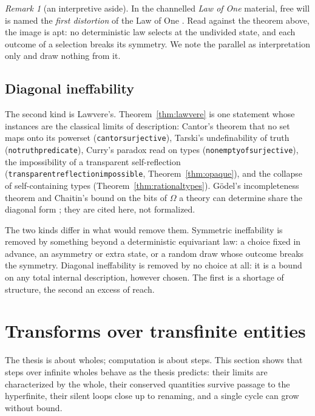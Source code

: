 \documentclass[]{article}
\theoremstyle{definition}
\theoremstyle{remark}
\newtheorem{remark}[theorem]{Remark}
\newcommand{\codeus}{\textunderscore\allowbreak}
\newcommand{\code}[1]{\texttt{\let\_\codeus #1}}
\newcommand{\Om}{\Omega}
\begin{document}
\begin{remark}[an interpretive aside]
\label{rem:ra}
In the channelled \emph{Law of One} material, free will is named the \emph{first distortion} of the
Law of One \cite{RaMaterial}. Read against the theorem above, the image is apt: no deterministic law
selects at the undivided state, and each outcome of a selection breaks its symmetry. We note
the parallel as interpretation only and draw nothing from it.
\end{remark}

\subsection{Diagonal ineffability}
\label{sec:diagonal}

The second kind is Lawvere's. Theorem~\ref{thm:lawvere} is one statement whose instances are the
classical limits of description: Cantor's theorem that no set maps onto its powerset
\cite{Cantor1891} (\code{cantor\_surjective}), Tarski's undefinability of truth \cite{Tarski1936}
(\code{no\_truth\_predicate}), Curry's paradox read on types (\code{nonempty\_of\_surjective}), the
impossibility of a transparent self-reflection (\code{transparent\_reflection\_impossible},
Theorem~\ref{thm:opaque}), and the collapse of self-containing types
(Theorem~\ref{thm:rationaltypes}). G\"odel's incompleteness theorem \cite{Godel1931} and Chaitin's
bound on the bits of $\Om$ a theory can determine \cite{Chaitin1975} share the diagonal form
\cite{Yanofsky2003}; they are cited here, not formalized.

The two kinds differ in what would remove them. Symmetric ineffability is removed by something
beyond a deterministic equivariant law: a choice fixed in advance, an asymmetry or extra state, or a
random draw whose outcome breaks the symmetry. Diagonal ineffability is removed by no choice at all:
it is a bound on any total internal description, however chosen. The first is a shortage of
structure, the second an excess of reach.

\section{Transforms over transfinite entities}
\label{sec:transforms}

The thesis is about wholes; computation is about steps. This section shows that steps over infinite
wholes behave as the thesis predicts: their limits are characterized by the whole, their conserved
quantities survive passage to the hyperfinite, their silent loops close up to renaming, and a single
cycle can grow without bound.
\end{document}
